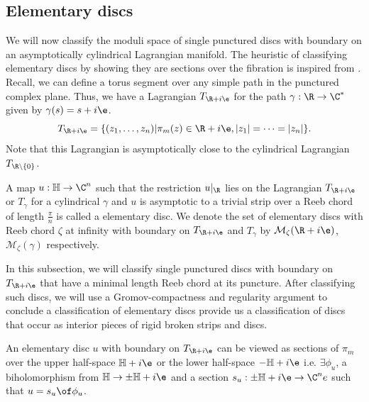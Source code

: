 \subsection{Elementary discs}

We will now classify the moduli space of single punctured discs with boundary on an asymptotically cylindrical Lagrangian manifold. The heuristic of classifying elementary discs by showing they are sections over the fibration is inspired from  \cite{seidelLongEx}. Recall, we can define a torus segment over any simple path in the punctured complex plane.   Thus, we have  a Lagrangian  $T_{\R+i\e} $ for the path $\gamma: \R \to \C^*$ given by $\gamma(s)=s+i\e$.  $$T_{\R+i\e} = \{(z_1,\dots,z_n)| \pi_m(z)\in \R+i\e, |z_1| = \dots  = |z_n|  \}.$$ Note that this Lagrangian is asymptotically close to the cylindrical Lagrangian $T_{\R \setminus \{0\}}$.


\begin{defn}
A map $u: \mathbb{H} \to \C^n$ such that the restriction $u|_\R$ lies on the Lagrangian $T_{\R+i\e}$ or $T_\gamma$ for a cylindrical $\gamma$ and $u$ is asymptotic to a trivial strip over a Reeb chord of length $\frac{\pi}{n}$ is called a elementary disc. We denote the set of elementary discs with Reeb chord $\zeta$ at infinity with boundary on $T_{\R+i\e}$ and $T_\gamma$ by $\mathcal{M}_\zeta(\R+i\e)$, $\mathcal M_\zeta{(\gamma)}$ respectively.
\end{defn} 

In this subsection, we will classify single punctured discs with boundary on $T_{\R+i\e}$ that have a minimal length Reeb chord at its puncture. After classifying such discs, we will use a Gromov-compactness and regularity argument to conclude a classification of elementary discs provide us a classification of discs that occur as interior pieces of rigid broken strips and discs.






\begin{lemma}\label{lemm:simpleissection}
 An elementary disc $u$ with boundary on $T_{\R+i\e}$ can be viewed as sections of $\pi_m$ over the upper half-space $\mathbb{H}+i\e$ or the lower half-space   $-\mathbb{H}+i\e$ i.e. $\exists \phi_u$, a biholomorphism from $\mathbb{H} \to \pm\mathbb{H}+i\e$ and a section $s_u:\pm\mathbb{H}+i\e \to \C^ne$ such that $u= s_u \of \phi_u $.

\end{lemma}

